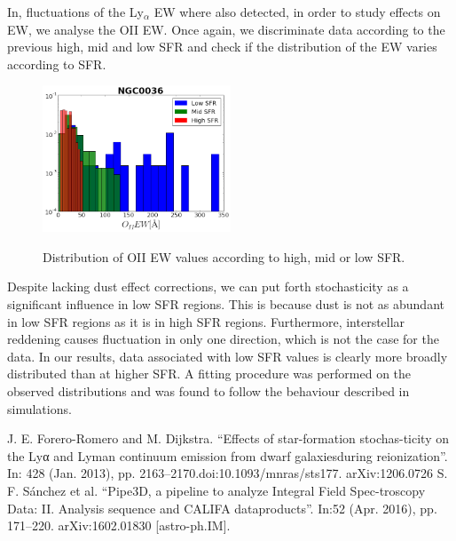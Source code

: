 \documentclass[preprint,proceedings]{rmaa}
\begin{document}
In\citep{Forero}, fluctuations of the Ly$_{\alpha}$ EW where also detected, in order to study effects on EW, we analyse the OII EW. Once again, we discriminate data according to the previous high, mid and low SFR and check if the distribution of the EW varies according to SFR.

\begin{figure}[h!]
\centering
\includegraphics[width=0.5\textwidth]{OIIEW_FINAL.png}
\label{fig2}
\caption{Distribution of OII EW values according to high, mid or low SFR.}

\centering
\end{figure}

Despite lacking dust effect corrections, we can put forth stochasticity as a significant influence in low SFR regions. This is because dust is not as abundant in low SFR regions as it is in high SFR regions. Furthermore, interstellar reddening causes fluctuation in only one direction, which is not the case for the data. In our results, data associated with low SFR values is clearly more broadly distributed than at higher SFR. A fitting procedure was performed on the observed distributions and was found to follow the behaviour described in simulations\citep{Forero}.  \\
 
\begin{thebibliography}
 J. E. Forero-Romero and M. Dijkstra. “Effects of star-formation stochas-ticity on the Lyα and Lyman continuum emission from dwarf galaxiesduring  reionization”.  In:  428  (Jan.  2013),  pp.  2163–2170.doi:10.1093/mnras/sts177. arXiv:1206.0726
 S. F. S\'anchez et al. “Pipe3D, a pipeline to analyze Integral Field Spec-troscopy Data: II. Analysis sequence and CALIFA dataproducts”. In:52 (Apr. 2016), pp. 171–220. arXiv:1602.01830 [astro-ph.IM].

  
\end{thebibliography}
\end{document}

